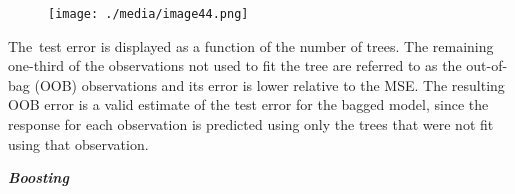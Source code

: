 \documentclass[12pt]{article}
\begin{document}

\begin{figure}[H]
	\begin{Center}
		\texttt{[image: ./media/image44.png]}
	\end{Center}
\end{figure}



\par

\begin{justify}
The\ test error is displayed as a function of the number of trees.  The remaining one-third of the observations not used to fit the tree are referred to as the out-of-bag (OOB) observations and its error is lower relative to the MSE. The resulting OOB error is a valid estimate of the test error for the bagged model, since the response for each observation is predicted using only the trees that were not fit using that observation.
\end{justify}\par


\vspace{\baselineskip}

\vspace{\baselineskip}

\vspace{\baselineskip}

\vspace{\baselineskip}

\vspace{\baselineskip}

\vspace{\baselineskip}

\vspace{\baselineskip}

\vspace{\baselineskip}

\vspace{\baselineskip}

\vspace{\baselineskip}

\vspace{\baselineskip}
\begin{justify}
\textbf{\textit{Boosting}}
\end{justify}\par
\end{document}
